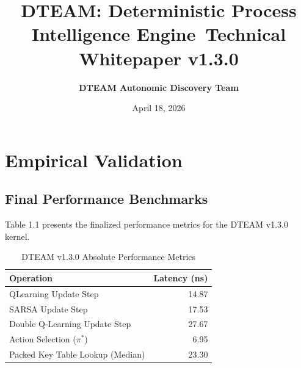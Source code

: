 \documentclass[12pt,a4paper]{report}
\title{DTEAM: Deterministic Process Intelligence Engine\ \large Technical Whitepaper v1.3.0}
\author{\textbf{DTEAM Autonomic Discovery Team}}
\date{April 18, 2026}
\begin{document}
\maketitle

\chapter{Empirical Validation}
\section{Final Performance Benchmarks}
Table 1.1 presents the finalized performance metrics for the DTEAM v1.3.0 kernel.
\begin{table}[ht]
\centering
\caption{DTEAM v1.3.0 Absolute Performance Metrics}
\begin{tabular}{lr}
\hline
Operation & Latency (ns) \\
\hline
QLearning Update Step & 14.87 \\
SARSA Update Step & 17.53 \\
Double Q-Learning Update Step & 27.67 \\
Action Selection ($\pi^*$) & 6.95 \\
Packed Key Table Lookup (Median) & 23.30 \\
\hline
\end{tabular}
\end{table}
\end{document}

